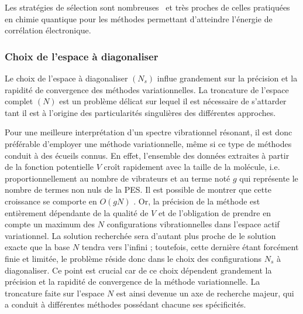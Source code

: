 Les stratégies de sélection sont nombreuses~\cite{pouchan1997ab,carter1997vibrational,koput2001ab,cassam2003alternative,gohaud2005new,culot1995vibrational} et très proches de celles pratiquées en chimie quantique pour les méthodes permettant d'atteindre l'énergie de corrélation électronique. 


\subsubsection*{Choix de l'espace à diagonaliser} 

Le choix de l'espace à diagonaliser $(N_s)$ influe grandement sur la précision et la rapidité de convergence des méthodes variationnelles. La troncature de l'espace complet $(N)$ est un problème délicat sur lequel il est nécessaire de s'attarder tant il est à l'origine des particularités singulières des différentes approches.

Pour une meilleure interprétation d'un spectre vibrationnel résonant, il est donc préférable d'employer une méthode variationnelle, même si ce type de méthodes conduit à des écueils connus. En effet, l'ensemble des données extraites à partir de la fonction potentielle $V$ croît rapidement avec la taille de la molécule, i.e. proportionnellement au nombre de vibrateurs et au terme noté $g$ qui représente le nombre de termes non nuls de la PES. Il est possible de montrer que cette croissance se comporte en $O(gN)$ \cite{colaud2016}. Or, la précision de la méthode est entièrement dépendante de la qualité de $V$ et de l'obligation de prendre en compte un maximum des $N$ configurations vibrationnelles dans l’espace actif variationnel. La solution recherchée sera d'autant plus proche de le solution exacte que la base $N$ tendra vers l'infini ; toutefois, cette dernière étant forcément finie et limitée, le problème réside donc dans le choix des configurations $N_{s}$ à diagonaliser. Ce point est crucial car de ce choix dépendent grandement la précision et la rapidité de convergence de la méthode variationnelle. La troncature faite sur l'espace $N$ est ainsi devenue un axe de recherche majeur, qui a conduit à différentes méthodes possédant chacune ses spécificités.

